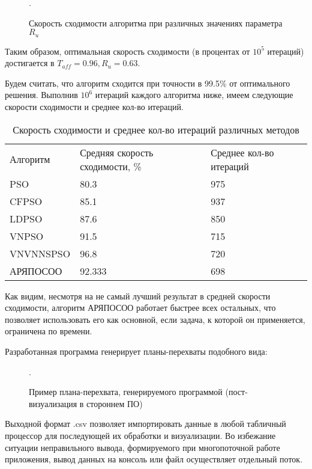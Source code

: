 \begin{figure*}[h!]
	\caption{Скорость сходимости алгоритма при различных значениях параметра $R_{u}$}.
\end{figure*} 

\newpage

Таким образом, оптимальная скорость сходимости (в процентах от $10^5$ итераций) достигается  в $T_{aff} = 0.96, R_{u} = 0.63$.

Будем считать, что алгоритм сходится  при точности в 99.5$\%$ от оптимального решения. Выполнив $10^6$ итераций каждого алгоритма ниже, имеем следующие скорости сходимости и среднее кол-во итераций.


\begin{table}[]
	\begin{tabular}{lll}
		Алгоритм  & Средняя скорость сходимости, \% & Среднее кол-во итераций \\
		PSO       & 80.3                    & 975                     \\
		CFPSO     & 85.1                    & 937                     \\
		LDPSO     & 87.6                    & 850                     \\
		VNPSO     & 91.5                    & 715                     \\
		VNVNNSPSO & 96.8                    & 720                     \\
		АРЯПОСОО  & 92.333                  & 698                    
	\end{tabular}
	\caption{Скорость сходимости и среднее кол-во итераций различных методов}
	\label{tab:converg_rate_and_avg_iters_number}
\end{table}

Как видим, несмотря на не самый лучший результат в средней скорости сходимости, алгоритм АРЯПОСОО работает быстрее всех остальных, что позволяет использовать его как основной, если задача, к которой он применяется, ограничена по времени. 

Разработанная  программа генерирует планы-перехваты подобного вида:



\begin{figure*}[]
	\caption{Пример плана-перехвата, генерируемого программой (пост-визуализация в стороннем ПО)}.
\end{figure*} 

\newpage

Выходной формат .csv позволяет импортировать данные в любой табличный процессор для последующей их обработки и визуализации. Во избежание ситуации неправильного вывода, формируемого при многопоточной работе приложения, вывод данных на консоль или файл осуществляет отдельный поток.
